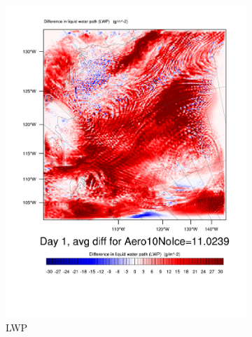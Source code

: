 \begin{figure}[hb]
\centering
	\begin{subfigure}{0.40\textwidth}
		\centering
		\includegraphics[width=\textwidth]{results/aero10ni/Diff_LWP_Day1Aero10NoIce.pdf}
		\caption{LWP}
		\label{subfig:LWPr4Day1}
	\end{subfigure}
	\quad
	\begin{subfigure}{0.40\textwidth}
		\centering

\end{subfigure}
\end{figure}
